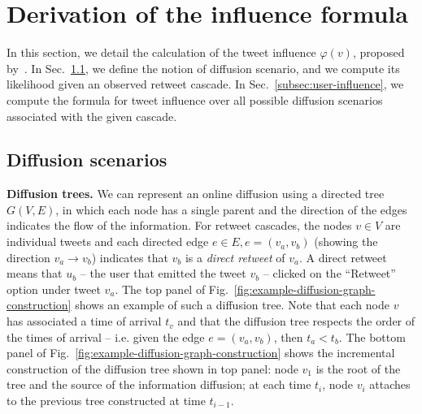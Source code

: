 %

\section{Derivation of the influence formula}
\label{si-sec:infl-derivation}

In this section, we detail the calculation of the tweet influence $\varphi(v)$, proposed by~\citet{Rizoiu2018a}.
In Sec.~\ref{subsec:diffusion-scenario}, we define the notion of diffusion scenario, and we compute its likelihood given an observed retweet cascade.
In Sec.~\ref{subsec:user-influence}, we compute the formula for tweet influence over all possible diffusion scenarios associated with the given cascade.

\subsection{Diffusion scenarios}
\label{subsec:diffusion-scenario}

\textbf{Diffusion trees.}
We can represent an online diffusion using a directed tree $G(V, E)$, in which each node has a single parent and the direction of the edges indicates the flow of the information.
For retweet cascades, the nodes $v \in V$ are individual tweets and each directed edge $e \in E, e = (v_a, v_b)$ (showing the direction $v_a \longrightarrow v_b$) indicates that $v_b$ is a \emph{direct retweet} of $v_a$.
A direct retweet means that $u_b$ -- the user that emitted the tweet $v_b$ -- clicked on the ``Retweet'' option under tweet $v_a$.
The top panel of Fig.~\ref{fig:example-diffusion-graph-construction} shows an example of such a diffusion tree.
Note that each node $v$ has associated a time of arrival $t_v$ and that the diffusion tree respects the order of the times of arrival -- i.e. given the edge $e = (v_a, v_b)$, then $t_a < t_b$.
The bottom panel of Fig.~\ref{fig:example-diffusion-graph-construction} shows the incremental construction of the diffusion tree shown in top panel:
node $v_1$ is the root of the tree and the source of the information diffusion; 
at each time $t_i$, node $v_i$ attaches to the previous tree constructed at time $t_{i-1}$.


